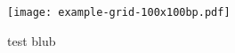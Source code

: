 \documentclass{beamer}
\begin{document}
    \begin{frame}
        \hspace*{-1cm}
        \texttt{[image: example-grid-100x100bp.pdf]}
    \end{frame}

    \begin{frame}
        \begin{block}{test}
            blub
        \end{block}
    \end{frame}
\end{document}
